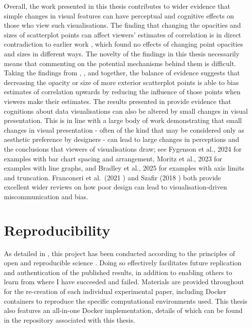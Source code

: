 \documentclass[../main.tex]{subfiles}
\begin{document}
Overall, the work presented in this thesis contributes to wider evidence
that simple changes in visual features can have perceptual
\cite{hong_2022} and cognitive \cite{karduni_2021} effects on those who
view such visualisations. The finding that changing the opacities and
sizes of scatterplot points can affect viewers' estimates of correlation
is in direct contradiction to earlier work
\cite{rensink_2012, rensink_2014}, which found no effects of changing
point opacities and sizes in different ways. The novelty of the findings
in this thesis necessarily means that commenting on the potential
mechanisms behind them is difficult. Taking the findings from
, , and
 together, the balance of evidence
suggests that decreasing the opacity or size of more exterior
scatterplot points is able to bias estimates of correlation upwards by
reducing the influence of those points when viewers make their
estimates. The results presented in  provide
evidence that cognitions about data visualisations can also be altered
by small changes in visual presentation. This is in line with a large
body of work demonstrating that small changes in visual presentation -
often of the kind that may be considered only as aesthetic preference by
designers - can lead to large changes in perceptions and the conclusions
that viewers of visualisations draw; see Fygenson et al., 2024
\cite{fygenson_2024} for examples with bar chart spacing and
arrangement, Moritz et al., 2023 \cite{moritz_2023} for examples with
line graphs, and Bradley et al., 2025 \cite{bradley_2025} for examples
with axis limits and truncation. Franconeri et al.~(2021
\cite{franconeri_2021}) and Szafir (2018 \cite{szafir_2018}) both
provide excellent wider reviews on how poor design can lead to
visualisation-driven miscommunication and bias.

\section{Reproducibility}\label{reproducibility}

As detailed in , this project has been conducted
according to the principles of open and reproducible science
\cite{ayris_2018}. Doing so effectively facilitates future replication
and authentication of the published results, in addition to enabling
others to learn from where I have succeeded and failed. Materials are
provided throughout for the re-creation of each individual experimental
paper, including Docker containers to reproduce the specific
computational environments used. This thesis also features an all-in-one
Docker implementation, details of which can be found in the repository
associated with this thesis.
\end{document}

